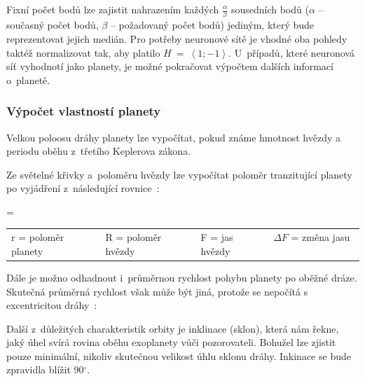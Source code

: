 \documentclass[a4paper,12pt]{article}
\begin{document}
{{Fixní počet bodů lze zajistit nahrazením každých $\frac{\alpha}{\beta}$ sousedních bodů ($\alpha$ -- současný počet bodů, $\beta$ -- požadovaný počet bodů) jediným, který bude reprezentovat jejich medián. Pro potřeby neuronové sítě je vhodné oba pohledy taktéž normalizovat tak, aby platilo $H~=~\left<1; -1\right>$. U~případů, které neuronová síť vyhodnotí jako planety, je možné pokračovat výpočtem dalších informací o~planetě.~\cite{kepler80}

\subsubsection{Výpočet vlastností planety}

Velkou poloosu dráhy planety lze vypočítat, pokud známe hmotnost hvězdy a periodu oběhu z~třetího Keplerova zákona.~\cite{transitprops}


Ze světelné křivky a~poloměru hvězdy lze vypočítat poloměr tranzitující planety po vyjádření z~následující rovnice~\cite{transit,transitprops}:

 { = }{
\begin{tabular}{llll}
	r = poloměr planety & R = poloměr hvězdy & F = jas hvězdy & $\Delta F$ = změna jasu \
\end{tabular}
}

Dále je možno odhadnout i~průměrnou rychlost pohybu planety po oběžné dráze. Skutečná průměrná rychlost však může být jiná, protože se nepočítá s excentricitou dráhy~\cite{transitprops}:


Další z~důležitých charakteristik orbity je inklinace (sklon), která nám řekne, jaký úhel svírá rovina oběhu exoplanety vůči pozorovateli. Bohužel lze zjistit pouze minimální, nikoliv skutečnou velikost úhlu sklonu dráhy. Inkinace se bude zpravidla blížit 90$^{\circ}$.~\cite{transitprops}

}}
\end{document}
